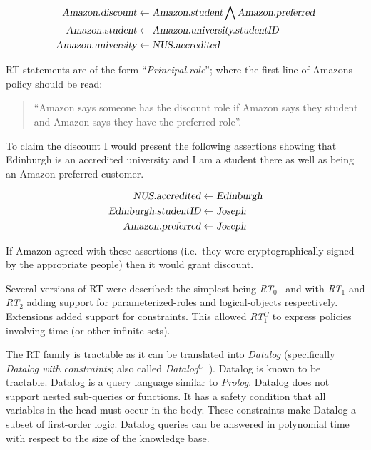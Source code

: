 \documentclass[a4paper]{article}
\begin{document}
\begin{align*}
  \textsl{Amazon.discount}   & \gets  \textsl{Amazon.student} \bigwedge \textsl{Amazon.preferred} \\
  \textsl{Amazon.student}    & \gets  \textsl{Amazon.university.studentID}                        \\
  \textsl{Amazon.university} & \gets  \textsl{NUS.accredited}                                     \\
\end{align*}

RT statements are of the form ``\textsl{Principal}.\textsl{role}''; where the
first line of Amazons policy should be read: 
\begin{quote}
  ``Amazon says someone has the discount role if Amazon says they student and
  Amazon says  they have the preferred role''.
\end{quote}

To claim the discount I would present the following assertions showing that
Edinburgh is an accredited university and I am a student there as well as being
an Amazon preferred customer.

\begin{align*}
  \textsl{NUS.accredited}      & \gets  \textsl{Edinburgh} \\
  \textsl{Edinburgh.studentID} & \gets  \textsl{Joseph}    \\
  \textsl{Amazon.preferred}    & \gets  \textsl{Joseph}    \\
\end{align*}

If Amazon agreed with these assertions (i.e.\ they were cryptographically signed
by the appropriate people) then it would grant discount.

Several versions of RT were described: the simplest being
\emph{RT$_0$}~\cite{Li:2003tj} and with \emph{RT$_1$} and \emph{RT$_2$} adding
support for parameterized-roles and logical-objects respectively. Extensions
added support for constraints.  This allowed \emph{RT$_1^C$}\cite{Li:2003ix} to
express policies involving time (or other infinite sets).

The RT family is tractable as it can be translated into
\emph{Datalog} (specifically \emph{Datalog with constraints}; also called
\emph{Datalog$^C$~\cite{Li:2003ix}}).  Datalog is known to be tractable. Datalog is a query
language similar to \emph{Prolog}. Datalog does not support nested sub-queries
or functions. It has a safety condition that all variables in the head must
occur in the body. These constraints make Datalog a subset of first-order logic.
Datalog queries can be answered in polynomial time with respect to the size of
the knowledge base.
\end{document}
